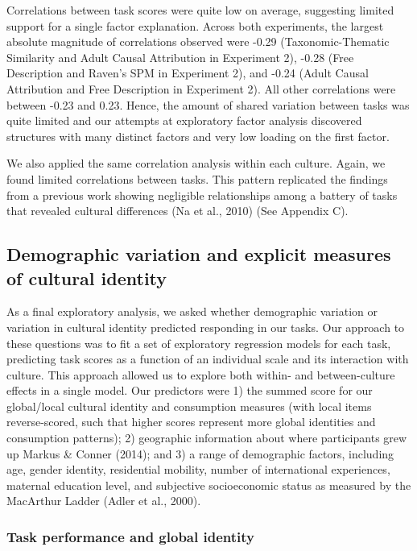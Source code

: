 \documentclass[
  man,floatsintext]{apa6}
\begin{document}
Correlations between task scores were quite low on average, suggesting limited support for a single factor explanation. Across both experiments, the largest absolute magnitude of correlations observed were -0.29 (Taxonomic-Thematic Similarity and Adult Causal Attribution in Experiment 2), -0.28 (Free Description and Raven's SPM in Experiment 2), and -0.24 (Adult Causal Attribution and Free Description in Experiment 2). All other correlations were between -0.23 and 0.23. Hence, the amount of shared variation between tasks was quite limited and our attempts at exploratory factor analysis discovered structures with many distinct factors and very low loading on the first factor.

We also applied the same correlation analysis within each culture. Again, we found limited correlations between tasks. This pattern replicated the findings from a previous work showing negligible relationships among a battery of tasks that revealed cultural differences (Na et al., 2010) (See Appendix C).

\hypertarget{demographic-variation-and-explicit-measures-of-cultural-identity}{%
\subsection{Demographic variation and explicit measures of cultural identity}\label{demographic-variation-and-explicit-measures-of-cultural-identity}}

As a final exploratory analysis, we asked whether demographic variation or variation in cultural identity predicted responding in our tasks. Our approach to these questions was to fit a set of exploratory regression models for each task, predicting task scores as a function of an individual scale and its interaction with culture. This approach allowed us to explore both within- and between-culture effects in a single model. Our predictors were 1) the summed score for our global/local cultural identity and consumption measures (with local items reverse-scored, such that higher scores represent more global identities and consumption patterns); 2) geographic information about where participants grew up Markus \& Conner (2014); and 3) a range of demographic factors, including age, gender identity, residential mobility, number of international experiences, maternal education level, and subjective socioeconomic status as measured by the MacArthur Ladder (Adler et al., 2000).

\hypertarget{task-performance-and-global-identity}{%
\subsubsection{Task performance and global identity}\label{task-performance-and-global-identity}}
\end{document}
